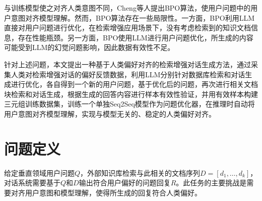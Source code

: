 与训练模型使之对齐人类意图不同，Cheng等人\cite{DBLP:journals/corr/abs-2311-04155}提出BPO算法，使用户问题中的用户意图对齐模型理解。然而，BPO算法存在一些局限性。一方面，BPO利用LLM直接对用户问题进行优化，在检索增强应用场景下，没有考虑检索到的知识文档信息，存在性能瓶颈。另一方面，BPO使用LLM进行用户问题优化，所生成的内容可能受到LLM的幻觉问题影响，因此数据有效性不足。

针对上述问题，本文提出一种基于人类偏好对齐的检索增强对话生成方法，通过采集人类对检索增强对话的偏好反馈数据，利用LLM分别针对数据库检索和对话生成进行优化，各自得到一个新的用户问题，基于优化后的问题，再次进行相关文档块检索和对话生成，根据生成的回答内容进行样本有效性验证，并用有效样本构建三元组训练数据集，训练一个单独Seq2Seq模型作为问题优化器，在推理时自动将用户意图对齐模型理解，实现与模型无关的、稳定的人类偏好对齐。



\section{问题定义}

给定垂直领域用户问题$Q$，外部知识库检索与此相关的文档序列$D = [d_1, \dots, d_k]$，对话系统需要基于$Q$和$D$输出符合用户偏好的问题回复$R$。此任务的主要挑战是需要对齐用户意图和模型理解，使得所生成的回复符合人类偏好。

